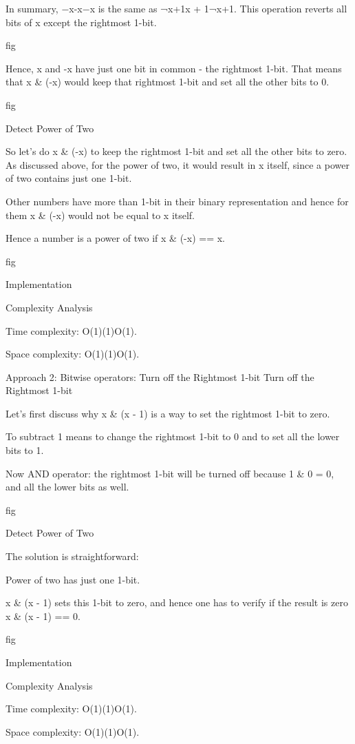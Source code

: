In summary, −x-x−x is the same as ¬x+1\lnot x + 1¬x+1. This operation reverts all bits of x except the rightmost 1-bit.

fig

Hence, x and -x have just one bit in common - the rightmost 1-bit. That means that x & (-x) would keep that rightmost 1-bit and set all the other bits to 0.

fig

Detect Power of Two

So let's do x & (-x) to keep the rightmost 1-bit and set all the other bits to zero. As discussed above, for the power of two, it would result in x itself, since a power of two contains just one 1-bit.

Other numbers have more than 1-bit in their binary representation and hence for them x & (-x) would not be equal to x itself.

Hence a number is a power of two if x & (-x) == x.

fig

Implementation


Complexity Analysis

Time complexity: O(1)(1)O(1).

Space complexity: O(1)(1)O(1).



Approach 2: Bitwise operators: Turn off the Rightmost 1-bit
Turn off the Rightmost 1-bit

Let's first discuss why x & (x - 1) is a way to set the rightmost 1-bit to zero.

To subtract 1 means to change the rightmost 1-bit to 0 and to set all the lower bits to 1.

Now AND operator: the rightmost 1-bit will be turned off because 1 & 0 = 0, and all the lower bits as well.

fig

Detect Power of Two

The solution is straightforward:

Power of two has just one 1-bit.

x & (x - 1) sets this 1-bit to zero, and hence one has to verify if the result is zero x & (x - 1) == 0.

fig

Implementation


Complexity Analysis

Time complexity: O(1)(1)O(1).

Space complexity: O(1)(1)O(1).
